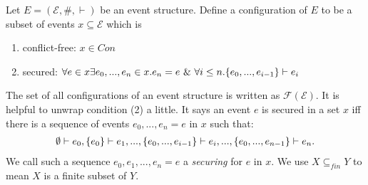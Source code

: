 \begin{definition}[Configuration]
    \label{conf}
    Let $E = (\mathcal{E},\#,\vdash)$ be an event structure.
    Define a configuration of $E$ to be a subset of events $x \subseteq \mathcal{E}$ which is
    \begin{enumerate}
        \item conflict-free: $x \in Con$
        \item secured: $\forall e \in x \exists e_0,...,e_n \in x. e_n = e \ \& \
                  \forall i \leq n. \{e_0,...,e_{i-1}\} \vdash e_i$
    \end{enumerate}
\end{definition}
The set of all configurations of an event structure is written as $\mathcal{F(E)}$.
It is helpful to unwrap condition (2) a little. It says an event $e$ is secured in a set $x$
iff there is a sequence of events $e_0,...,e_n = e$ in $x$ such that:
\begin{align*}
    \emptyset \vdash e_0, \{e_0\} \vdash e_1, ..., \{e_0,...,e_{i-1}\} \vdash e_i,...,
    \{e_0,...,e_{n-1}\} \vdash e_n.
\end{align*}
We call such a sequence $e_0,e_1,...,e_n = e$ a \emph{securing} for $e$ in $x$.
We use $X \subseteq_{fin} Y$ to mean $X$ is a finite subset of $Y$.

